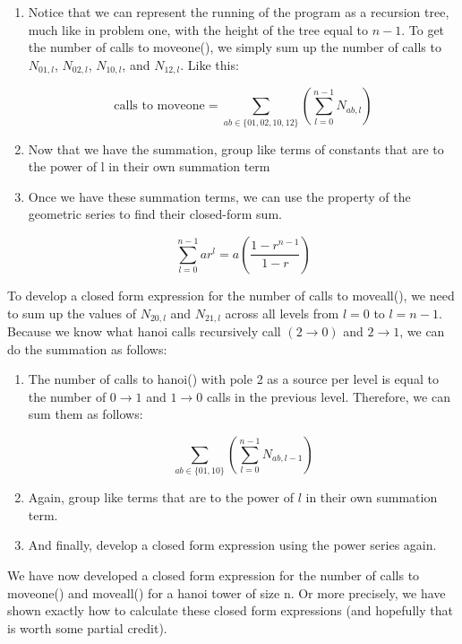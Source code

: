 \documentclass[11pt, letterpaper]{article}
\begin{document}
\begin{enumerate}[label=(\alph*)]
\begin{enumerate}[label=\arabic*.]
\item Notice that we can represent the running of the program as a recursion tree, much like in problem one, with the height of the tree equal to $n - 1$. To get the number of calls to moveone(), we simply sum up the number of calls to $N_{01, l}$, $N_{02, l}$, $N_{10, l}$, and $N_{12, l}$. Like this:

$$ \text{calls to moveone} =  \sum_{ab \in \{01, 02, 10, 12\}} \left( \sum_{l = 0}^{n - 1} N_{ab, l} \right) $$

\item Now that we have the summation, group like terms of constants that are to the power of l in their own summation term

\item Once we have these summation terms, we can use the property of the geometric series to find their closed-form sum. 

$$ \sum_{l = 0}^{n - 1} ar^l = a \left( \frac{1 - r^{n - 1}}{1 - r} \right) $$

\end{enumerate}

\quad To develop a closed form expression for the number of calls to moveall(), we need to sum up the values of $N_{20, l}$ and $N_{21, l}$ across all levels from $l = 0$ to $l = n-1$. Because we know what hanoi calls recursively call $(2 \rightarrow 0)$ and $2 \rightarrow 1$, we can do the summation as follows:

\begin{enumerate}[label=\arabic*.]
\item The number of calls to hanoi() with pole 2 as a source per level is equal to the number of $0 \rightarrow 1$ and $1 \rightarrow 0$ calls in the previous level. Therefore, we can sum them as follows:

$$ \sum_{ab \in \{01, 10\}} \left( \sum_{l = 0}^{n - 1} N_{ab, l - 1} \right) $$

\item Again, group like terms that are to the power of $l$ in their own summation term.

\item And finally, develop a closed form expression using the power series again. 

\end{enumerate}

\quad We have now developed a closed form expression for the number of calls to moveone() and moveall() for a hanoi tower of size n. Or more precisely, we have shown exactly how to calculate these closed form expressions (and hopefully that is worth some partial credit).

\end{enumerate}
\end{document}
